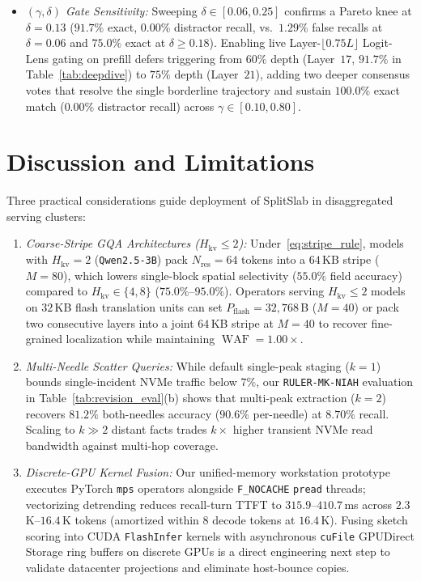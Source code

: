 \documentclass[10pt,journal,compsoc]{IEEEtran}
\theoremstyle{definition}
\theoremstyle{remark}
\newcommand{\SplitSlab}{\textup{\textsc{SplitSlab}}}
\newcommand{\WAF}{\operatorname{WAF}}
\def\SplitSlab{SplitSlab}%
\begin{document}
\begin{itemize}
  \item \emph{$(\gamma, \delta)$ Gate Sensitivity:} Sweeping $\delta \in [0.06, 0.25]$ confirms a Pareto knee at $\delta = 0.13$ ($91.7\%$ exact, $0.00\%$ distractor recall, vs.\ $1.29\%$ false recalls at $\delta = 0.06$ and $75.0\%$ exact at $\delta \ge 0.18$). Enabling live Layer-$\lfloor 0.75L\rfloor$ Logit-Lens gating on prefill defers triggering from $60\%$ depth (Layer~$17$, $91.7\%$ in Table~\ref{tab:deepdive}) to $75\%$ depth (Layer~$21$), adding two deeper consensus votes that resolve the single borderline trajectory and sustain $100.0\%$ exact match ($0.00\%$ distractor recall) across $\gamma \in [0.10, 0.80]$.
\end{itemize}

\section{Discussion and Limitations}\label{sec:discussion}

Three practical considerations guide deployment of \SplitSlab{} in disaggregated serving clusters:
\begin{enumerate}
  \item \emph{Coarse-Stripe GQA Architectures ($H_{\mathrm{kv}} \le 2$):} Under~\eqref{eq:stripe_rule}, models with $H_{\mathrm{kv}} = 2$ (\texttt{Qwen2.5-3B}) pack $N_{\mathrm{res}} = 64$ tokens into a $64$\,KB stripe ($M = 80$), which lowers single-block spatial selectivity ($55.0\%$ field accuracy) compared to $H_{\mathrm{kv}} \in \{4,8\}$ ($75.0\%$--$95.0\%$). Operators serving $H_{\mathrm{kv}} \le 2$ models on $32$\,KB flash translation units can set $P_{\mathrm{flash}} = 32{,}768$\,B ($M = 40$) or pack two consecutive layers into a joint $64$\,KB stripe at $M = 40$ to recover fine-grained localization while maintaining $\WAF = 1.00\times$.
  \item \emph{Multi-Needle Scatter Queries:} While default single-peak staging ($k{=}1$) bounds single-incident NVMe traffic below $7\%$, our \texttt{RULER-MK-NIAH} evaluation in Table~\ref{tab:revision_eval}(b) shows that multi-peak extraction ($k{=}2$) recovers $81.2\%$ both-needles accuracy ($90.6\%$ per-needle) at $8.70\%$ recall. Scaling to $k \gg 2$ distant facts trades $k\times$ higher transient NVMe read bandwidth against multi-hop coverage.
  \item \emph{Discrete-GPU Kernel Fusion:} Our unified-memory workstation prototype executes PyTorch \texttt{mps} operators alongside \texttt{F\_NOCACHE} \texttt{pread} threads; vectorizing detrending reduces recall-turn TTFT to $315.9$--$410.7$\,ms across $2.3$\,K--$16.4$\,K tokens (amortized within $8$ decode tokens at $16.4$\,K). Fusing sketch scoring into CUDA \texttt{FlashInfer} kernels with asynchronous \texttt{cuFile} GPUDirect Storage ring buffers on discrete GPUs is a direct engineering next step to validate datacenter projections and eliminate host-bounce copies.
\end{enumerate}
\end{document}
